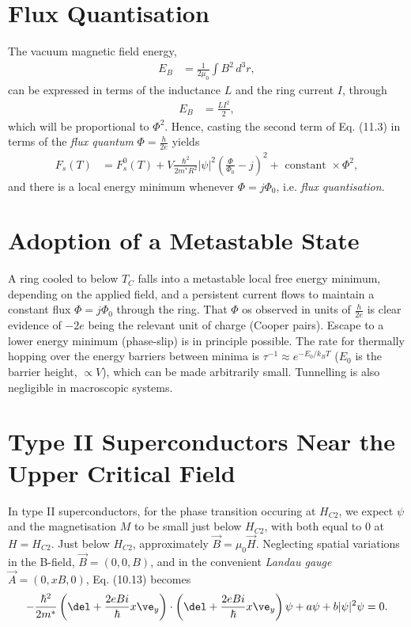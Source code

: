 \documentclass[qo.tex]{subfiles}
\begin{document}
\section{Flux Quantisation}
The vacuum magnetic field energy,
\begin{align}
    E_B &= \frac{1}{2\mu_0}\int B^2\,d^3r,
\end{align}
can be expressed in terms of the inductance $L$ and the ring current $I$, through 
\begin{align}
    E_B &= \frac{LI^2}{2},
\end{align}
which will be proportional to $\Phi^2$.
Hence, casting the second term of Eq. (11.3) in terms of the \emph{flux quantum} $\Phi=\frac{h}{2e}$ yields
\begin{align}
    F_s(T) &= F_s^0(T) + V\frac{\hbar^2}{2m^*R^2}|\psi|^2\left(\frac{\Phi}{\Phi_0}-j\right)^2 + \text{ constant } \times\Phi^2,
\end{align}
and there is a local energy minimum whenever $\Phi=j\Phi_0$, i.e. \emph{flux quantisation}.

\section{Adoption of a Metastable State}
A ring cooled to below $T_C$ falls into a metastable local free energy minimum, depending on the applied field, and a persistent current flows to maintain a constant flux $\Phi=j\Phi_0$ through the ring. 
That $\Phi$ os observed in units of $\frac{h}{2e}$ is clear evidence of $-2e$ being the relevant unit of charge (Cooper pairs).
Escape to a lower energy minimum (phase-slip) is in principle possible. 
The rate for thermally hopping over the energy barriers between minima is $\tau^{-1}\approx e^{-E_0/k_BT}$ ($E_0$ is the barrier height, $\propto V$), which can be made arbitrarily small. 
Tunnelling is also negligible in macroscopic systems.

\section{Type II Superconductors Near the Upper Critical Field}
In type II superconductors, for the phase transition occuring at $H_{C2}$, we expect $\psi$ and the magnetisation $M$ to be small just below $H_{C2}$, with both equal to 0 at $H=H_{C2}$.
Just below $H_{C2}$, approximately $\vec{B}=\mu_0\vec{H}$. 
Neglecting spatial variations in the B-field, $\vec{B}=(0,0,B)$, and in the convenient \emph{Landau gauge} $\vec{A}=(0,xB,0)$, Eq. (10.13) becomes
\begin{align}
    -\frac{\hbar^2}{2m^*}\left(\del+\frac{2eBi}{\hbar}x\ve_y\right)\cdot\left(\del+\frac{2eBi}{\hbar}x\ve_y\right)\psi + a\psi + b|\psi|^2\psi = 0.
\end{align}
\end{document}
